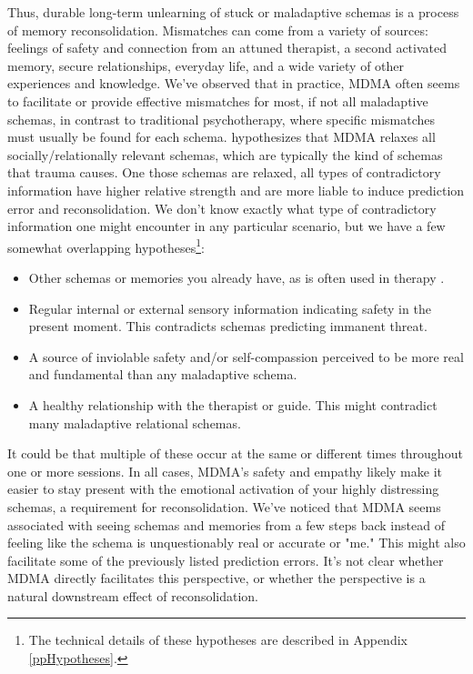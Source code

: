 \documentclass[12pt,letterpaper]{book}
\begin{document}
Thus, durable long-term unlearning of stuck or maladaptive schemas is a process of memory reconsolidation. Mismatches can come from a variety of sources: feelings of safety and connection from an attuned therapist, a second activated memory, secure relationships, everyday life, and a wide variety of other experiences and knowledge. We've observed that in practice, MDMA often seems to facilitate or provide effective mismatches for most, if not all maladaptive schemas, in contrast to traditional psychotherapy, where specific mismatches must usually be found for each schema. \textcite{carhart2019rebus} hypothesizes that MDMA relaxes all socially/relationally relevant schemas, which are typically the kind of schemas that trauma causes. One those schemas are relaxed, all types of contradictory information have higher relative strength and are more liable to induce prediction error and reconsolidation. We don't know exactly what type of contradictory information one might encounter in any particular scenario, but we have a few somewhat overlapping hypotheses\footnote{The technical details of these hypotheses are described in Appendix \ref{ppHypotheses}.}:
\begin{itemize}
	\item Other schemas or memories you already have, as is often used in therapy \cite{eckerUnlocking}.
	\item Regular internal or external sensory information indicating safety in the present moment. This contradicts schemas predicting immanent threat.
	\item A source of inviolable safety and/or self-compassion perceived to be more real and fundamental than any maladaptive schema.
	\item A healthy relationship with the therapist or guide. This might contradict many maladaptive relational schemas.
\end{itemize}
It could be that multiple of these occur at the same or different times throughout one or more sessions. In all cases, MDMA's safety and empathy likely make it easier to stay present with the emotional activation of your highly distressing schemas, a requirement for reconsolidation. We've noticed that MDMA seems associated with seeing schemas and memories from a few steps back instead of feeling like the schema is unquestionably real or accurate or "me." This might also facilitate some of the previously listed prediction errors. It's not clear whether MDMA directly facilitates this perspective, or whether the perspective is a natural downstream effect of reconsolidation.
\end{document}
